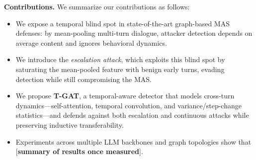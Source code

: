 \noindent\textbf{Contributions.} We summarize our contributions as follows:
\begin{itemize}
    \item We expose a temporal blind spot in state-of-the-art graph-based MAS
    defenses: by mean-pooling multi-turn dialogue, attacker detection depends on
    average content and ignores behavioral dynamics.
    \item We introduce the \emph{escalation attack}, which exploits this blind
    spot by saturating the mean-pooled feature with benign early turns, evading
    detection while still compromising the MAS.
    \item We propose \textbf{T-GAT}, a temporal-aware detector that models
    cross-turn dynamics---self-attention, temporal convolution, and
    variance/step-change statistics---and defends against both escalation and
    continuous attacks while preserving inductive transferability.
    \item Experiments across multiple LLM backbones and graph topologies show that
    [\textbf{summary of results once measured}].
\end{itemize}
